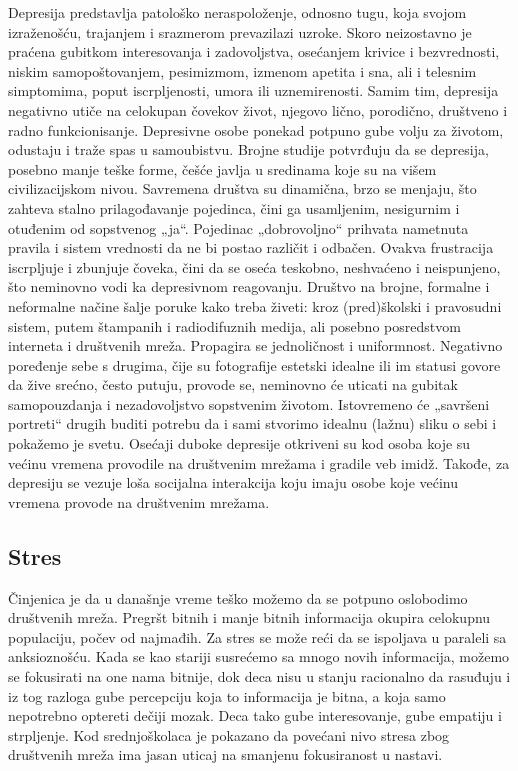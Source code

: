 \documentclass[a4paper]{article}
\begin{document}
{		
		Depresija predstavlja patološko neraspoloženje, odnosno tugu, koja svojom izraženošću, trajanjem i srazmerom prevazilazi uzroke. Skoro neizostavno je praćena gubitkom interesovanja i zadovoljstva, osećanjem krivice i bezvrednosti, niskim samopoštovanjem, pesimizmom, izmenom apetita i sna, ali i telesnim simptomima, poput iscrpljenosti, umora ili uznemirenosti. Samim tim, depresija negativno utiče na celokupan čovekov život, njegovo lično, porodično, društveno i radno funkcionisanje. Depresivne osobe ponekad potpuno gube volju za životom, odustaju i traže spas u samoubistvu.
		Brojne studije potvrđuju da se depresija, posebno manje teške forme, češće javlja u sredinama koje su na višem civilizacijskom nivou. Savremena društva su dinamična, brzo se menjaju, što zahteva stalno prilagođavanje pojedinca, čini ga usamljenim, nesigurnim  i otuđenim od sopstvenog „ja“. Pojedinac „dobrovoljno“ prihvata nametnuta pravila i sistem vrednosti da ne bi postao različit i odbačen. Ovakva frustracija iscrpljuje i zbunjuje čoveka, čini da se oseća teskobno, neshvaćeno i neispunjeno, što neminovno vodi ka depresivnom reagovanju. Društvo na brojne, formalne i neformalne načine šalje poruke kako treba živeti: kroz (pred)školski i pravosudni sistem, putem štampanih i radiodifuznih medija, ali posebno posredstvom interneta i društvenih mreža. Propagira se jednoličnost i uniformnost. Negativno poređenje sebe s drugima, čije su fotografije estetski idealne ili im statusi govore da žive srećno, često putuju, provode se, neminovno će uticati na gubitak samopouzdanja i nezadovoljstvo sopstvenim životom. Istovremeno će „savršeni portreti“ drugih buditi potrebu da i sami stvorimo idealnu (lažnu) sliku o sebi i pokažemo je svetu. Osećaji duboke depresije otkriveni su kod osoba koje su većinu vremena provodile na društvenim mrežama i gradile veb imidž. Takođe, za depresiju se vezuje loša socijalna interakcija koju imaju osobe koje većinu vremena provode na društvenim mrežama.
		
		\subsection{Stres}
		
		Činjenica je da u današnje vreme teško možemo da se potpuno oslobodimo društvenih mreža. Pregršt bitnih i manje bitnih informacija okupira celokupnu populaciju, počev od najmađih. Za stres se može reći da se ispoljava u paraleli sa anksioznošću. Kada se kao stariji susrećemo sa mnogo novih informacija, možemo se fokusirati na one nama bitnije, dok deca nisu u stanju racionalno da rasuđuju i iz tog razloga gube percepciju koja to informacija je bitna, a koja samo nepotrebno optereti dečiji mozak. Deca tako gube interesovanje, gube empatiju i strpljenje. Kod srednjoškolaca je pokazano da povećani nivo stresa zbog društvenih mreža ima jasan uticaj na smanjenu fokusiranost u nastavi.
		
}
\end{document}
